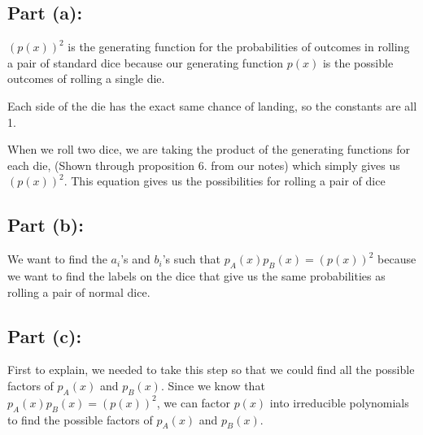 \documentclass[answers]{exam}
\begin{document}
\begin{questions}

		\begin{solution}
			\subsection*{Part (a):}
			$(p(x))^2$ is the generating function for the probabilities of outcomes in rolling a pair of standard dice because our generating function $p(x)$ is the possible outcomes of rolling a single die.

			Each side of the die has the exact same chance of landing, so the constants are all 1. 
			
			When we roll two dice, we are taking the product of the generating functions for each die, (Shown through proposition 6. from our notes) which simply gives us $(p(x))^2$. This equation gives us the possibilities for rolling a pair of dice

			\subsection*{Part (b):}

			We want to find the $a_i$'s and $b_i$'s such that $p_A(x)p_B(x) = (p(x))^2$ because we want to find the labels on the dice that give us the same probabilities as rolling a pair of normal dice.

			\subsection*{Part (c):}
		First to explain, we needed to take this step so that we could find all the possible factors of $p_A(x)$ and $p_B(x)$.  Since we know that $p_A(x)p_B(x) = (p(x))^2$, we can factor $p(x)$ into irreducible polynomials to find the possible factors of $p_A(x)$ and $p_B(x)$.


\end{solution}
\end{questions}
\end{document}
